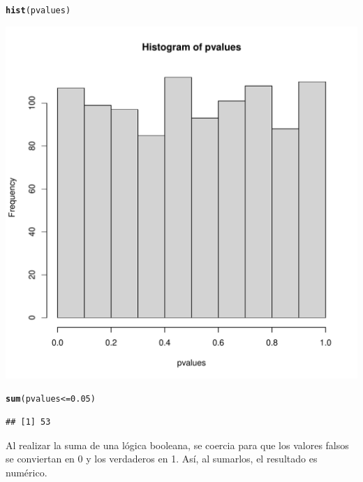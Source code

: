 \documentclass{config/apuntes}\usepackage[]{graphicx}\usepackage[]{xcolor}
\makeatletter
\def\maxwidth{ %
  \ifdim\Gin@nat@width>\linewidth
    \linewidth
  \else
    \Gin@nat@width
  \fi
}
\newcommand{\hlnum}[1]{\textcolor[rgb]{0.686,0.059,0.569}{#1}}%
\newcommand{\hlopt}[1]{\textcolor[rgb]{0,0,0}{#1}}%
\newcommand{\hldef}[1]{\textcolor[rgb]{0.345,0.345,0.345}{#1}}%
\newcommand{\hlkwd}[1]{\textcolor[rgb]{0.737,0.353,0.396}{\textbf{#1}}}%
\newenvironment{kframe}{%
 \def\at@end@of@kframe{}%
 \ifinner\ifhmode%
  \def\at@end@of@kframe{\end{minipage}}%
  \begin{minipage}{\columnwidth}%
 \fi\fi%
 \def\FrameCommand##1{\hskip\@totalleftmargin \hskip-\fboxsep
 \colorbox{shadecolor}{##1}\hskip-\fboxsep
     \hskip-\linewidth \hskip-\@totalleftmargin \hskip\columnwidth}%
 \MakeFramed {\advance\hsize-\width
   \@totalleftmargin\z@ \linewidth\hsize
   \@setminipage}}%
 {\par\unskip\endMakeFramed%
 \at@end@of@kframe}
\newenvironment{knitrout}{}{} %
\makeatother
\begin{document}
\begin{knitrout}
\color{fgcolor}\begin{kframe}
\begin{alltt}
\hlkwd{hist}\hldef{(pvalues)}
\end{alltt}
\end{kframe}
\includegraphics[width=\maxwidth]{figure/unnamed-chunk-7-1} 
\begin{kframe}\begin{alltt}
\hlkwd{sum}\hldef{(pvalues} \hlopt{<=} \hlnum{0.05}\hldef{)}
\end{alltt}
\begin{verbatim}
## [1] 53
\end{verbatim}
\end{kframe}
\end{knitrout}

Al realizar la suma de una lógica booleana, se coercia para que los valores falsos se conviertan en 0 y los verdaderos en 1. Así, al sumarlos, el resultado es numérico. 
\end{document}
